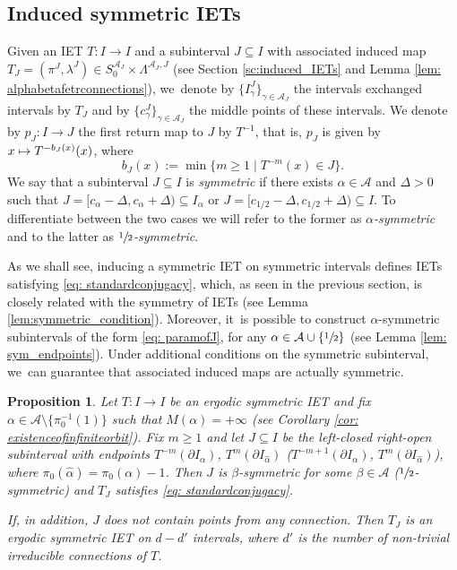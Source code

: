 \documentclass[10pt,a4paper]{amsart}
\newcommand\mto{\mathchoice{\longmapsto}{\mapsto}{\mapsto}{\mapsto}}
\theoremstyle{plain}
\newtheorem{proposition}[theorem]{Proposition}
\theoremstyle{definition}
\newcommand{\A}{\mathcal{A}}
\begin{document}
\subsection{Induced symmetric IETs}
Given an IET $T: I \to I$ and a subinterval $J \subseteq I$ with associated induced map $T_J = (\pi^J, \lambda^J) \in S_0^{\A_J} \times \Lambda^{\A_J, J}$ (see Section \ref{sc:induced_IETs} and Lemma \ref{lem: alphabetafetrconnections}), we~denote by $\{I^J_\gamma\}_{\gamma \in \A_J}$ the intervals exchanged intervals by $T_J$ and by $\{c^J_\gamma\}_{\gamma \in \A_J}$ the middle points of these intervals. We denote by $p_J : I \to J$ the first return map to $J$ by $T^{-1}$, that is, $p_J$ is given by $x \mto T^{-b_J(x)}(x)$, where
\begin{equation}
\label{eq:backward_return}
b_J(x) := \min\{m \geq 1 \mid T^{-m}(x) \in J\}.
\end{equation}
We say that a subinterval $J \subseteq I$ is \emph{symmetric} if there exists $\alpha \in \A$ and $\Delta > 0$ such that $J = [c_\alpha - \Delta, c_\alpha + \Delta) \subseteq I_\alpha$ or $J=\big[c_{1/2}-\Delta, c_{1/2} +\Delta\big)\subseteq I$. To differentiate between the two cases we will refer to the former as \emph{$\alpha$-symmetric} and to the latter as \emph{$\sfrac{1}{2}$-symmetric}.

As we shall see, inducing a symmetric IET on symmetric intervals defines IETs satisfying \eqref{eq: standardconjugacy}, which, as seen in the previous section, is closely related with the symmetry of IETs (see Lemma \ref{lem:symmetric_condition}). Moreover, it~is possible to construct $\alpha$-symmetric subintervals of the form \eqref{eq: paramofJ}, for any $\alpha \in \A \cup \{\sfrac{1}{2}\}$ (see Lemma \ref{lem: sym_endpoints}). Under additional conditions on the symmetric subinterval, we~can guarantee that associated induced maps are actually symmetric.

\begin{proposition}
\label{prop:induced_symmetric}
Let $T: I \to I$ be an ergodic symmetric IET and fix $\alpha \in \A \setminus \{\pi_0^{-1}(1)\}$ such that $M(\alpha) = +\infty$ (see Corollary \ref{cor: existenceofinfiniteorbit}). Fix $m \geq 1$ and let $J \subseteq I$ be the left-closed right-open subinterval with endpoints $T^{-m}(\partial I_\alpha)$, $T^{m}(\partial I_{\hat \alpha})$ (\resp $T^{-m + 1}(\partial I_\alpha)$, $T^{m}(\partial I_{\hat \alpha})$), where $\pi_0(\hat \alpha) = \pi_0(\alpha) - 1$.
Then $J$ is $\beta$-symmetric for some $\beta \in \A$ (\resp $\sfrac{1}{2}$-symmetric) and $T_J$ satisfies \eqref{eq: standardconjugacy}.

If, in addition, $J$ does not contain points from any connection. Then $T_J$ is an ergodic symmetric IET on $d - d'$ intervals, where $d'$ is the number of non-trivial {irreducible} connections of $T$.
\end{proposition}
\end{document}
